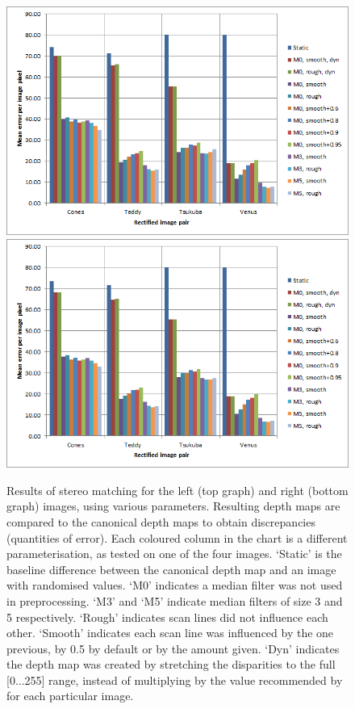 \begin{figure}[p]
  \centering
  \includegraphics[height=0.4\textheight]{Stereo-left-report}\\[2mm]
  \includegraphics[height=0.4\textheight]{Stereo-right-report}
  \caption[Results of stereo matching]{Results of stereo matching for the left
    (top graph) and right (bottom graph) images, using various parameters.
    Resulting depth maps are compared to the canonical depth maps to obtain
    discrepancies (quantities of error). Each coloured column in the chart is a
    different parameterisation, as tested on one of the four images. `Static' is
    the baseline difference between the canonical depth map and an image with
    randomised values. `M0' indicates a median filter was not used in
    preprocessing. `M3' and `M5' indicate median filters of size 3 and 5
    respectively. `Rough' indicates scan lines did not influence each other.
    `Smooth' indicates each scan line was influenced by the one previous, by 0.5
    by default or by the amount given. `Dyn' indicates the depth map was created
    by stretching the disparities to the full [0...255] range, instead of
    multiplying by the value recommended by \citet{middlebury} for each
    particular image.}
  \label{fig:stereo-report}
\end{figure}

